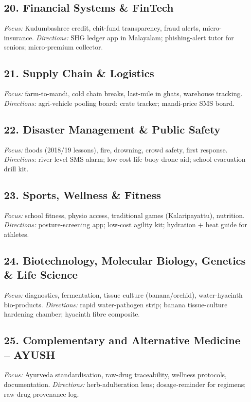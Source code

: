 \documentclass[11pt,a4paper]{article}
\begin{document}
\subsection{20. Financial Systems \& FinTech}
\textit{Focus:} Kudumbashree credit, chit-fund transparency, fraud alerts, micro-insurance. \textit{Directions:} SHG ledger app in Malayalam; phishing-alert tutor for seniors; micro-premium collector.

\subsection{21. Supply Chain \& Logistics}
\textit{Focus:} farm-to-mandi, cold chain breaks, last-mile in ghats, warehouse tracking. \textit{Directions:} agri-vehicle pooling board; crate tracker; mandi-price SMS board.

\subsection{22. Disaster Management \& Public Safety}
\textit{Focus:} floods (2018/19 lessons), fire, drowning, crowd safety, first response. \textit{Directions:} river-level SMS alarm; low-cost life-buoy drone aid; school-evacuation drill kit.

\subsection{23. Sports, Wellness \& Fitness}
\textit{Focus:} school fitness, physio access, traditional games (Kalaripayattu), nutrition. \textit{Directions:} posture-screening app; low-cost agility kit; hydration + heat guide for athletes.

\subsection{24. Biotechnology, Molecular Biology, Genetics \& Life Science}
\textit{Focus:} diagnostics, fermentation, tissue culture (banana/orchid), water-hyacinth bio-products. \textit{Directions:} rapid water-pathogen strip; banana tissue-culture hardening chamber; hyacinth fibre composite.

\subsection{25. Complementary and Alternative Medicine -- AYUSH}
\textit{Focus:} Ayurveda standardisation, raw-drug traceability, wellness protocols, documentation. \textit{Directions:} herb-adulteration lens; dosage-reminder for regimens; raw-drug provenance log.
\end{document}
